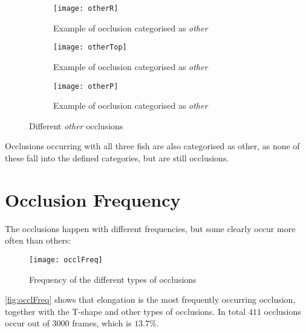 \begin{figure}[H]
	\centering
	\begin{subfigure}[b]{0.3\textwidth}
		\texttt{[image: otherR]}
		\caption{Example of occlusion categorised as \textit{other}}
		\label{fig:otherR}
	\end{subfigure}
	\begin{subfigure}[b]{0.3\textwidth}
		\texttt{[image: otherTop]}
		\caption{Example of occlusion categorised as \textit{other}}
		\label{fig:otherTop}
	\end{subfigure}
	\begin{subfigure}[b]{0.3\textwidth}
		\texttt{[image: otherP]}
		\caption{Example of occlusion categorised as \textit{other}}
		\label{fig:otherP}
	\end{subfigure}
	\caption{Different \textit{other} occlusions}
	\label{fig:other}
\end{figure}

Occlusions occurring with all three fish are also categorised as other, as none of these fall into the defined categories, but are still occlusions.

\section{Occlusion Frequency}
The occlusions happen with different frequencies, but some clearly occur more often than others:

\begin{figure}[H]
	\centering
	\texttt{[image: occlFreq]}
	\caption{Frequency of the different types of occlusions}
	\label{fig:occlFreq}
\end{figure}

\autoref{fig:occlFreq} shows that elongation is the most frequently occurring occlusion, together with the T-shape and other types of occlusions. In total $ 411 $ occlusions occur out of $ 3000 $ frames, which is $13.7\%$.
